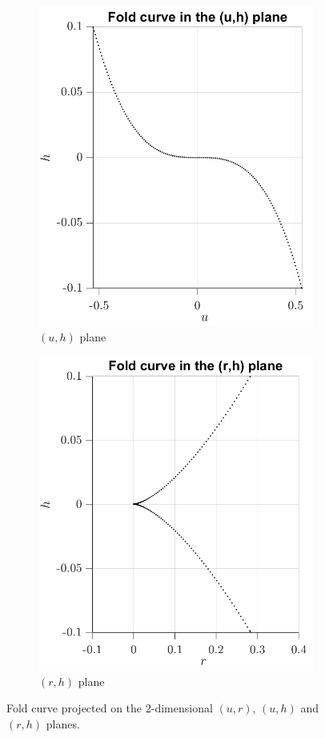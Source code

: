 \documentclass[a4paper,11pt]{article}
\begin{document}
\begin{figure}[H]
{\begin{subfigure}{0.43\linewidth}
		\includegraphics[width=\textwidth]{folduh.png}
		\caption{$(u,h)$ plane}
	\end{subfigure}
	\begin{subfigure}{0.43\linewidth}
		\centering
		\includegraphics[width=\textwidth]{foldrh.png}
		\caption{$(r,h)$ plane}
		\label{fig:foldcrh}
	\end{subfigure}
	}
	\caption{Fold curve projected on the 2-dimensional $(u,r)$, $(u,h)$ and $(r,h)$ planes.}
	\label{fig:foldc}
\end{figure}
\end{document}
